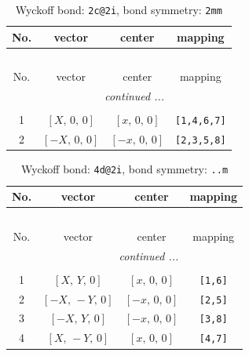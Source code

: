 \documentclass[fleqn,8pt]{jsarticle}
\begin{document}
\begin{longtable}{cccc}
\caption{Wyckoff bond: {\tt 2c@2i}, bond symmetry: {\tt 2mm}}
 \\
 \hline \hline
No. & vector & center & mapping \\ \hline \endfirsthead

\multicolumn{3}{l}{\tablename\ \thetable{}} \\
 \hline \hline
No. & vector & center & mapping \\ \hline \endhead

 \hline \hline
\multicolumn{3}{r}{\footnotesize\it continued ...} \\ \endfoot

 \hline \hline
\multicolumn{3}{r}{} \\ \endlastfoot

1 & $\left[ X,\, 0,\, 0 \right]$ & $\left[ x,\, 0,\, 0 \right]$ & {\tt [1,4,6,7]} \\ \hline
2 & $\left[ - X,\, 0,\, 0 \right]$ & $\left[ - x,\, 0,\, 0 \right]$ & {\tt [2,3,5,8]} \\
\end{longtable}
\renewcommand{\arraystretch}{1.2}
\begin{longtable}{cccc}
\caption{Wyckoff bond: {\tt 4d@2i}, bond symmetry: {\tt ..m}}
 \\
 \hline \hline
No. & vector & center & mapping \\ \hline \endfirsthead

\multicolumn{3}{l}{\tablename\ \thetable{}} \\
 \hline \hline
No. & vector & center & mapping \\ \hline \endhead

 \hline \hline
\multicolumn{3}{r}{\footnotesize\it continued ...} \\ \endfoot

 \hline \hline
\multicolumn{3}{r}{} \\ \endlastfoot

1 & $\left[ X,\, Y,\, 0 \right]$ & $\left[ x,\, 0,\, 0 \right]$ & {\tt [1,6]} \\ \hline
2 & $\left[ - X,\, - Y,\, 0 \right]$ & $\left[ - x,\, 0,\, 0 \right]$ & {\tt [2,5]} \\ \hline
3 & $\left[ - X,\, Y,\, 0 \right]$ & $\left[ - x,\, 0,\, 0 \right]$ & {\tt [3,8]} \\ \hline
4 & $\left[ X,\, - Y,\, 0 \right]$ & $\left[ x,\, 0,\, 0 \right]$ & {\tt [4,7]} \\
\end{longtable}
\end{document}
